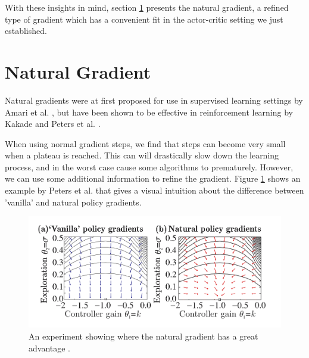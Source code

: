 With these insights in mind, section \ref{sec:natural} presents the natural gradient, a refined type of gradient which has a convenient fit in the actor-critic setting we just established.

\section{Natural Gradient}
\label{sec:natural}

Natural gradients were at first proposed for use in supervised learning settings by Amari et al. \cite{Amari:1998:NGW:287476.287477}, but have been shown to be effective in reinforcement learning by Kakade \cite{Kakade:2001} and Peters et al. \cite{4863}.

When using normal gradient steps, we find that steps can become very small when a plateau is reached. 
This can will drastically slow down the learning process, and in the worst case cause some algorithms to prematurely. 
However, we can use some additional information to refine the gradient. 
Figure \ref{fig:nat-grad-adv} shows an example by Peters et al. \cite{Peters_IICHR_2003} that gives a visual intuition about the difference between 'vanilla' and natural policy gradients. 

\begin{figure}
  \includegraphics[width=\textwidth]{nat-grad-adv}
  \caption{An experiment showing where the natural gradient has a great advantage \cite{Peters_IICHR_2003}. }\label{fig:nat-grad-adv}
\end{figure}

